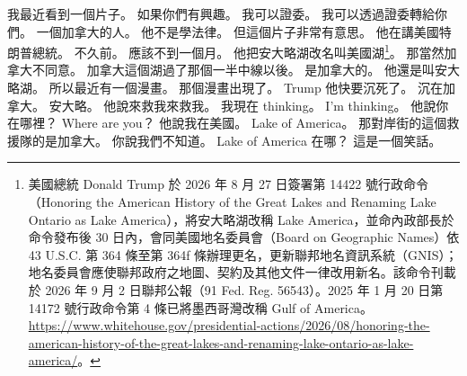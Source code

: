 \hypertarget{w01:cue:2030}{}我最近看到一個片子。
\hypertarget{w01:cue:2031}{}如果你們有興趣。
\hypertarget{w01:cue:2032}{}我可以證委。
\hypertarget{w01:cue:2033}{}我可以透過證委轉給你們。
\hypertarget{w01:cue:2034}{}一個加拿大的人。
\hypertarget{w01:cue:2035}{}他不是學法律。
\hypertarget{w01:cue:2036}{}但這個片子非常有意思。
\hypertarget{w01:cue:2037}{}他在講美國特朗普總統。
\hypertarget{w01:cue:2038}{}不久前。
\hypertarget{w01:cue:2039}{}應該不到一個月。
\hypertarget{w01:cue:2040}{}他把安大略湖改名叫美國湖\footnote{美國總統 Donald Trump 於 2026 年 8 月 27 日簽署第 14422 號行政命令（Honoring the American History of the Great Lakes and Renaming Lake Ontario as Lake America），將安大略湖改稱 Lake America，並命內政部長於命令發布後 30 日內，會同美國地名委員會（Board on Geographic Names）依 43 U.S.C. 第 364 條至第 364f 條辦理更名，更新聯邦地名資訊系統（GNIS）；地名委員會應使聯邦政府之地圖、契約及其他文件一律改用新名。該命令刊載於 2026 年 9 月 2 日聯邦公報（91 Fed. Reg. 56543）。2025 年 1 月 20 日第 14172 號行政命令第 4 條已將墨西哥灣改稱 Gulf of America。\url{https://www.whitehouse.gov/presidential-actions/2026/08/honoring-the-american-history-of-the-great-lakes-and-renaming-lake-ontario-as-lake-america/}。}。
\hypertarget{w01:cue:2041}{}那當然加拿大不同意。
\hypertarget{w01:cue:2042}{}加拿大這個湖過了那個一半中線以後。
\hypertarget{w01:cue:2043}{}是加拿大的。
\hypertarget{w01:cue:2044}{}他還是叫安大略湖。
\hypertarget{w01:cue:2045}{}所以最近有一個漫畫。
\hypertarget{w01:cue:2046}{}那個漫畫出現了。
\hypertarget{w01:cue:2047}{}Trump 他快要沉死了。
\hypertarget{w01:cue:2048}{}沉在加拿大。
\hypertarget{w01:cue:2049}{}安大略。
\hypertarget{w01:cue:2050}{}他說來救我來救我。
\hypertarget{w01:cue:2051}{}我現在 thinking。
\hypertarget{w01:cue:2052}{}I'm thinking。
\hypertarget{w01:cue:2053}{}他說你在哪裡？
\hypertarget{w01:cue:2054}{}Where are you？
\hypertarget{w01:cue:2055}{}他說我在美國。
\hypertarget{w01:cue:2056}{}Lake of America。
\hypertarget{w01:cue:2057}{}那對岸街的這個救援隊的是加拿大。
\hypertarget{w01:cue:2058}{}你說我們不知道。
\hypertarget{w01:cue:2059}{}Lake of America 在哪？
\hypertarget{w01:cue:2060}{}這是一個笑話。

